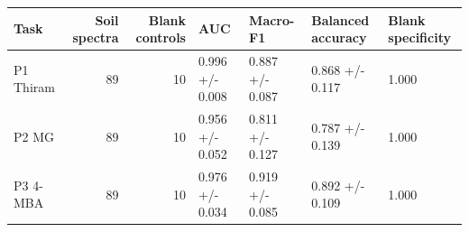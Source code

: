 \begin{tabular}{lrrllll}
\toprule
Task & Soil spectra & Blank controls & AUC & Macro-F1 & Balanced accuracy & Blank specificity \\
\midrule
P1 Thiram & 89 & 10 & 0.996 +/- 0.008 & 0.887 +/- 0.087 & 0.868 +/- 0.117 & 1.000 \\
P2 MG & 89 & 10 & 0.956 +/- 0.052 & 0.811 +/- 0.127 & 0.787 +/- 0.139 & 1.000 \\
P3 4-MBA & 89 & 10 & 0.976 +/- 0.034 & 0.919 +/- 0.085 & 0.892 +/- 0.109 & 1.000 \\
\bottomrule
\end{tabular}
